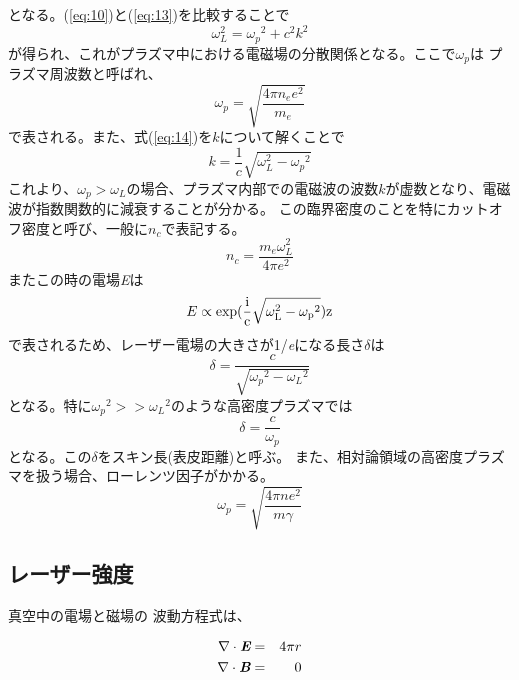 \documentclass[a4paper,11pt,titlepage]{jarticle}
\numberwithin{equation}{section} %
\begin{document}
  となる。(\ref{eq:10})と(\ref{eq:13})を比較することで
  \begin{equation}
    \label{eq:14}
    \omega_L^2={\omega_p}^2+c^2 k^2
  \end{equation}
  が得られ、これがプラズマ中における電磁場の分散関係となる。ここで$\omega_p$は
  プラズマ周波数と呼ばれ、
  \begin{equation}
    \label{eq:15}
    \omega_p = \sqrt{\frac{4\pi n_e e^2}{m_e}}
  \end{equation}
  で表される。また、式(\ref{eq:14})を$k$について解くことで
  \begin{equation}
    \label{eq:16}
    k=\frac{1}{c} \sqrt{\omega_L^2 - {\omega_p}^2}
  \end{equation}
  これより、$\omega_p > \omega_L$の場合、プラズマ内部での電磁波の波数$k$が虚数となり、電磁波が指数関数的に減衰することが分かる。
  この臨界密度のことを特にカットオフ密度と呼び、一般に$n_c$で表記する。
  \begin{equation}
    \label{eq:17}
    n_c=\frac{m_e \omega_L^2}{4\pi e^2}
  \end{equation}
  またこの時の電場\textit{E}は
  \begin{equation}
    \label{eq:18}
    E\propto \rm{exp}(\frac{i}{c} \sqrt{\omega_L^2 - {\omega_p}^2})z
  \end{equation}
  で表されるため、レーザー電場の大きさが1/\textit{e}になる長さ$\delta$は
  \begin{equation}
    \label{eq:19}
    \delta = \frac{c}{\sqrt{{\omega_p}^2-{\omega_L}^2}}
  \end{equation}  
  となる。特に${\omega_p}^2>>{\omega_L}^2$のような高密度プラズマでは
  \begin{equation}
    \label{eq:20}
    \delta = \frac{c}{\omega_p}
  \end{equation}
  となる。この$\delta$をスキン長(表皮距離)と呼ぶ。
  また、相対論領域の高密度プラズマを扱う場合、ローレンツ因子がかかる。
  \begin{equation}
    \label{eq:21}
    \omega_p=\sqrt{\frac{4\pi ne^2}{m\gamma}}
  \end{equation} 

  \subsection{レーザー強度}
  真空中の電場と磁場の 波動方程式は、
  
  \begin{eqnarray}
    \label{eq:2-3-1}
    \nabla \cdot \textit{\textbf{E}} &=& 4\pi r\\
    \label{eq:2-3-2}
    \nabla \cdot \textit{\textbf{B}} &=& 0
  \end{eqnarray}
  
\end{document}
